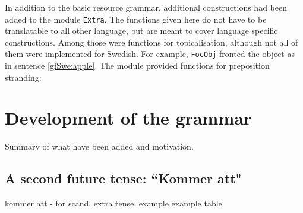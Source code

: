 \documentclass{report}
\begin{document}
In addition to the basic resource grammar, additional constructions had been added
to the module \verb|Extra|. The functions given here do not have to be translatable
to all other language, but are meant to cover language specific constructions.
Among those were functions for topicalisation, although not all
of them were implemented for Swedish.
For example, \verb|FocObj| fronted the object as in sentence \ref{gfSwe:apple}.
\label{gfSwe:apple}
The module provided functions for preposition stranding:






\section{Development of the grammar}
\label{sec:Added}
Summary of what have been added and motivation.

\subsection{A second future tense: ``Kommer att"}
kommer att - for scand, extra tense, example
example table
\end{document}
